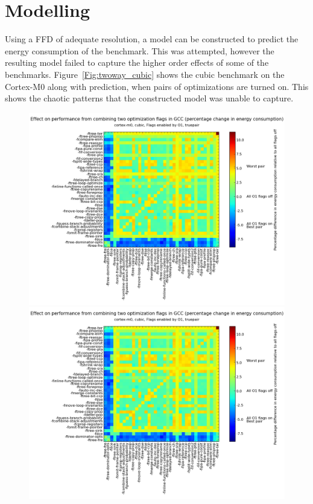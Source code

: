\documentclass[twocolumn]{article}
\newcommand{\nsection}[1]{\section{\bfseries #1}}
\let\oldcaption\caption
\renewcommand{\caption}[1]{\oldcaption{\textup{#1}}}
\begin{document}
\nsection{Modelling}

Using a FFD of adequate resolution, a model can be constructed to predict the energy consumption of the benchmark. This was attempted, however the resulting model failed to capture the higher order effects of some of the benchmarks. Figure~\ref{Fig:twoway_cubic} shows the cubic benchmark on the Cortex-M0 along with prediction, when pairs of optimizations are turned on. This shows the chaotic patterns that the constructed model was unable to capture.

\begin{figure}
	\centering
    \begin{minipage}[l]{0.98\columnwidth}
        \centering
		\includegraphics[width=1.0\linewidth, clip, trim= 8.8cm 0 4.8cm 2cm]{cortex-m0/o1cub_-7p5_10.png}
    \end{minipage}
    \hfill
    \begin{minipage}[l]{0.07\columnwidth}
        \centering
        \includegraphics[width=1.0\linewidth, clip, trim= 29.1cm 0 0cm 1.7cm]{cortex-m0/o1cub_-7p5_10.png}

\end{minipage}
\end{figure}
\end{document}
